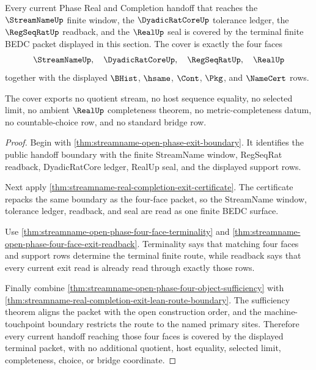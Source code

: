 \begin{theorem}
\label{thm:streamname-open-phase-handoff-terminal-cover}
Every current Phase Real and Completion handoff that reaches the $\StreamNameUp$ finite window, the $\DyadicRatCoreUp$ tolerance ledger, the $\RegSeqRatUp$ readback, and the $\RealUp$ seal is covered by the terminal finite BEDC packet displayed in this section. The cover is exactly the four faces
$$
\StreamNameUp,\quad \DyadicRatCoreUp,\quad \RegSeqRatUp,\quad \RealUp
$$
together with the displayed $\BHist$, $\hsame$, $\Cont$, $\Pkg$, and $\NameCert$ rows.

The cover exports no quotient stream, no host sequence equality, no selected limit, no ambient $\RealUp$ completeness theorem, no metric-completeness datum, no countable-choice row, and no standard bridge row.
\end{theorem}
\begin{proof}
Begin with \autoref{thm:streamname-open-phase-exit-boundary}. It identifies the public handoff boundary with the finite StreamName window, RegSeqRat readback, DyadicRatCore ledger, RealUp seal, and the displayed support rows.

Next apply \autoref{thm:streamname-real-completion-exit-certificate}. The certificate repacks the same boundary as the four-face packet, so the StreamName window, tolerance ledger, readback, and seal are read as one finite BEDC surface.

Use \autoref{thm:streamname-open-phase-four-face-terminality} and \autoref{thm:streamname-open-phase-four-face-exit-readback}. Terminality says that matching four faces and support rows determine the terminal finite route, while readback says that every current exit read is already read through exactly those rows.

Finally combine \autoref{thm:streamname-open-phase-four-object-sufficiency} with \autoref{thm:streamname-real-completion-exit-lean-route-boundary}. The sufficiency theorem aligns the packet with the open construction order, and the machine-touchpoint boundary restricts the route to the named primary sites. Therefore every current handoff reaching those four faces is covered by the displayed terminal packet, with no additional quotient, host equality, selected limit, completeness, choice, or bridge coordinate.
\end{proof}

